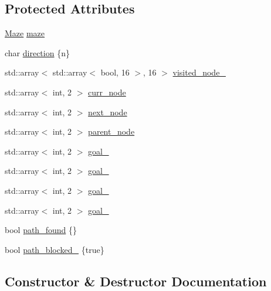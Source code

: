 \subsection*{Protected Attributes}
\begin{DoxyCompactItemize}
\item 
\hyperlink{classfp_1_1_maze}{Maze} \hyperlink{classfp_1_1_algorithm_a5eaa9074986ebf65f2f549f78eedd0f2}{maze}
\item 
char \hyperlink{classfp_1_1_algorithm_afdbf632b658aea1aef75caa90e60a8fc}{direction} \{\textquotesingle{}n\textquotesingle{}\}
\item 
std\+::array$<$ std\+::array$<$ bool, 16 $>$, 16 $>$ \hyperlink{classfp_1_1_algorithm_a41904cf962dd8c46901d39ab03d77545}{visited\+\_\+node\+\_\+}
\item 
std\+::array$<$ int, 2 $>$ \hyperlink{classfp_1_1_algorithm_a88395e8c0b52c4aef33b41caff21300c}{curr\+\_\+node}
\item 
std\+::array$<$ int, 2 $>$ \hyperlink{classfp_1_1_algorithm_ac3672498d86469ee445fe66a140952cb}{next\+\_\+node}
\item 
std\+::array$<$ int, 2 $>$ \hyperlink{classfp_1_1_algorithm_ac90048223f33b81908e9c7367ec355bc}{parent\+\_\+node}
\item 
std\+::array$<$ int, 2 $>$ \hyperlink{classfp_1_1_algorithm_a9fcc4bf2df720fef33da5705cd317480}{goal\+\_}
\item 
std\+::array$<$ int, 2 $>$ \hyperlink{classfp_1_1_algorithm_aa01beb678f2db28d33e32f1060341bcc}{goal\+\_}
\item 
std\+::array$<$ int, 2 $>$ \hyperlink{classfp_1_1_algorithm_a8e8b41783484c3a30ae85bcd978d5e46}{goal\+\_}
\item 
std\+::array$<$ int, 2 $>$ \hyperlink{classfp_1_1_algorithm_a9832306da6877eba455ef5160c4a7f86}{goal\+\_}
\item 
bool \hyperlink{classfp_1_1_algorithm_a2a305831ed2802bbb7e9149eda9dd637}{path\+\_\+found} \{\}
\item 
bool \hyperlink{classfp_1_1_algorithm_a7a37ba8431c685c42f305a73812efecb}{path\+\_\+blocked\+\_\+} \{true\}
\end{DoxyCompactItemize}


\subsection{Constructor \& Destructor Documentation}
\mbox{\label{classfp_1_1_algorithm_adaa1af41614b0d95c2a940cc87c68a2e}} 
